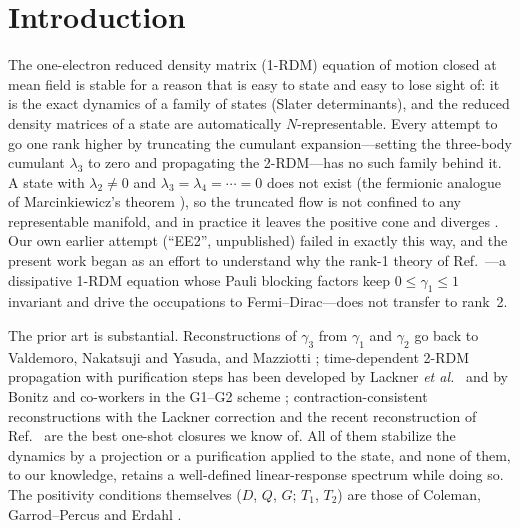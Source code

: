 \documentclass[aip,jcp,reprint,floatfix,superscriptaddress]{revtex4-2}
\begin{document}
\maketitle

\section{Introduction}
The one-electron reduced density matrix (1-RDM) equation of motion closed at mean field is stable for a reason that is easy to state and easy to lose sight of: it is the exact dynamics of a family of states (Slater determinants), and the reduced density matrices of a state are automatically $N$-representable. Every attempt to go one rank higher by truncating the cumulant expansion---setting the three-body cumulant $\lambda_3$ to zero and propagating the 2-RDM---has no such family behind it. A state with $\lambda_2\neq 0$ and $\lambda_3=\lambda_4=\cdots=0$ does not exist (the fermionic analogue of Marcinkiewicz's theorem \cite{marcinkiewicz1939,rajagopal1974}), so the truncated flow is not confined to any representable manifold, and in practice it leaves the positive cone and diverges \cite{akbari2012}. Our own earlier attempt (``EE2'', unpublished) failed in exactly this way, and the present work began as an effort to understand why the rank-1 theory of Ref.~---a dissipative 1-RDM equation whose Pauli blocking factors keep $0\le\gamma_1\le 1$ invariant and drive the occupations to Fermi--Dirac---does not transfer to rank~2.

The prior art is substantial. Reconstructions of $\gamma_3$ from $\gamma_1$ and $\gamma_2$ go back to Valdemoro, Nakatsuji and Yasuda, and Mazziotti \cite{nakatsuji1996,mazziotti1998,kutzelnigg1999}; time-dependent 2-RDM propagation with purification steps has been developed by Lackner \emph{et al.}\ \cite{lackner2015,lackner2017} and by Bonitz and co-workers in the G1--G2 scheme \cite{joost2020,joost2022}; contraction-consistent reconstructions with the Lackner correction and the recent reconstruction of Ref.~ are the best one-shot closures we know of. All of them stabilize the dynamics by a projection or a purification applied to the state, and none of them, to our knowledge, retains a well-defined linear-response spectrum while doing so. The positivity conditions themselves ($D$, $Q$, $G$; $T_1$, $T_2$) are those of Coleman, Garrod--Percus and Erdahl \cite{coleman1963,garrod1964,mazziotti2007}.
\end{document}
